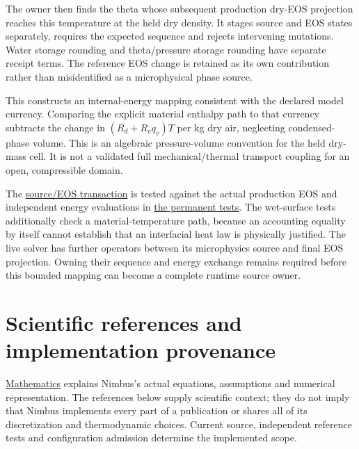 \documentclass[
  11pt,
]{report}
\begin{document}
The owner then finds the theta whose subsequent production dry-EOS
projection reaches this temperature at the held dry density. It stages
source and EOS states separately, requires the expected sequence and
rejects intervening mutations. Water storage rounding and theta/pressure
storage rounding have separate receipt terms. The reference EOS change
is retained as its own contribution rather than misidentified as a
microphysical phase source.

This constructs an internal-energy mapping consistent with the declared
model currency. Comparing the explicit material enthalpy path to that
currency subtracts the change in \((R_d+R_vq_v)T\) per kg dry air,
neglecting condensed-phase volume. This is an algebraic pressure-volume
convention for the held dry-mass cell. It is not a validated full
mechanical/thermal transport coupling for an open, compressible domain.

The
\href{../src/microphysics/schemes/milbrandt/triple_source_eos_energy.hpp}{source/EOS
transaction} is tested against the actual production EOS and independent
energy evaluations in
\href{../tests/physics/test_milbrandt_triple_source_eos_energy.cpp}{the
permanent tests}. The wet-surface tests additionally check a
material-temperature path, because an accounting equality by itself
cannot establish that an interfacial heat law is physically justified.
The live solver has further operators between its microphysics source
and final EOS projection. Owning their sequence and energy exchange
remains required before this bounded mapping can become a complete
runtime source owner.











\chapter{Scientific references and implementation
provenance}\label{scientific-references-and-implementation-provenance}

\href{MATHEMATICS.pdf}{Mathematics} explains Nimbus's actual equations,
assumptions and numerical representation. The references below supply
scientific context; they do not imply that Nimbus implements every part
of a publication or shares all of its discretization and thermodynamic
choices. Current source, independent reference tests and configuration
admission determine the implemented scope.
\end{document}
